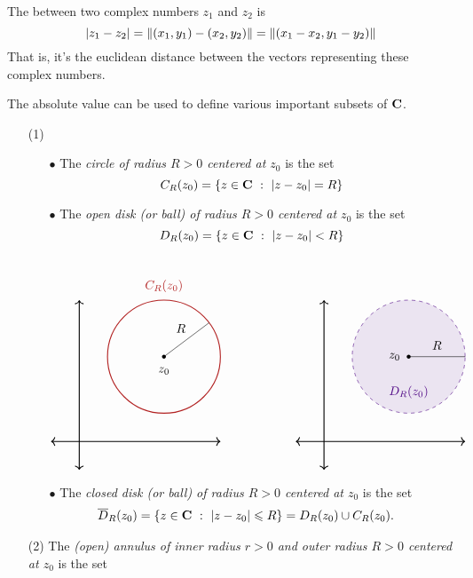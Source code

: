 
\begin{definition}[Distance]
The  between two complex numbers $z_1$ and $z_2$ is \[\left\lvert z_1 - z_2\right\rvert = \left\lVert(x_1,y_1) - (x_2,y_2)\right\rVert = \left\lVert(x_1 - x_2,y_1 - y_2)\right\rVert\]
That is, it's the euclidean distance between the vectors representing these complex numbers. 
\end{definition}

\vspace*{1em}

\begin{discussion}\label{firstdomain}
The absolute value can be used to define various important subsets of $\mathbf C$.
\begin{itemize}[itemsep=1em]
\item[(1)]
\begin{itemize}[itemsep=1em]
\item[$\bullet$] The \emph{circle of radius $R>0$ centered at $z_0$} is the set
\[C_R(z_0) = \left\{z\in \mathbf C\ :\ \left\lvert z-z_0\right\rvert=R\right\}\]
\item[$\bullet$] The \emph{open disk (or ball) of radius $R>0$ centered at $z_0$} is the set
\[D_R(z_0) = \left\{z\in \mathbf C\ :\ \left\lvert z-z_0\right\rvert< R\right\}\]\\[-1em]
\[\begin{tikzpicture}[scale=0.8]
    \draw[<->,thick] (-1,0)--(5,0);
	\draw[<->,thick] (0,-1)--(0,5);
    \draw[thick,firebrick](3,3) circle (2);
    \draw[](3,3)--(4.6,4.2);
    \fill (3,3) circle (2pt);
    \node[] at (3,2.5) {$z_0$};
    \node[] at (3,5.5) {\color{firebrick}$C_R(z_0)$};
    \node[] at (3.6,4) {$R$};
  \end{tikzpicture}
  \qquad \qquad \qquad
  \begin{tikzpicture}[scale=0.8]
    \draw[<->,thick] (-1,0)--(5,0);
	\draw[<->,thick] (0,-1)--(0,5);
	\filldraw[indigo,fill opacity=1/10,dashed](3,3) circle (2);
    \draw[](3,3)--(5,3);
    \fill (3,3) circle (2pt);
    \node[] at (2.5,3) {$z_0$};
    \node[] at (3,1.75) {\color{indigo}$D_R(z_0)$};
    \node[] at (4,3.4) {$R$};
  \end{tikzpicture}\]
\item[$\bullet$] The \emph{closed disk (or ball) of radius $R>0$ centered at $z_0$} is the set
\begin{align*}
\overline{D}_R(z_0) &= \left\{z\in \mathbf C\ :\ \left\lvert z-z_0\right\rvert \leqslant R\right\} = D_R(z_0) \cup C_R(z_0).
\end{align*}
\end{itemize}
\item[(2)] The \emph{(open) annulus of inner radius $r>0$ and outer radius $R>0$ centered at $z_0$} is the set

\end{itemize}
\end{discussion}
